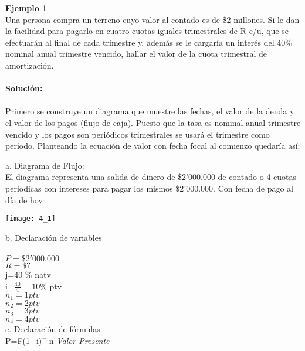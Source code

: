 \textbf{Ejemplo 1}\\

Una persona compra un terreno cuyo valor al contado es de \$2 millones. Si le dan la facilidad para pagarlo en cuatro cuotas iguales trimestrales de R c/u, que se efectuarán al final de cada trimestre y, además se le cargaría un interés del 40\% nominal anual trimestre vencido, hallar el valor de la cuota trimestral de amortización.\\\\
\textbf{Solución:}\\\\
Primero se construye un diagrama que muestre las fechas, el valor de la deuda y el valor de los pagos (flujo de caja). Puesto que la tasa es nominal anual  trimestre vencido y los pagos son  periódicos trimestrales se usará el trimestre como período.	
Planteando la ecuación de valor con fecha focal al comienzo quedaría así:

\clearpage

a. Diagrama de Flujo: \\
El diagrama representa una salida de dinero de \$2'000.000 de contado o 4 cuotas periodicas con intereses para pagar los mismos \$2'000.000. Con fecha de pago al día de hoy.

\begin{center}
	\texttt{[image: 4\_1]}
\end{center}

b. Declaración de variables\\ \\


	
	    $P=\$2'000.000$\\
	$	R=\$?$
		\\
		j=40 \% natv
		\\
		i=$\frac{40}{4}=10\%$ ptv\\
		$n_{1}=1 ptv$\\
		$n_{2}=2 ptv$\\
		$n_{3}=3 ptv$\\
		$n_{4}=4 ptv$\\
		


c. Declaración de fórmulas \\



	P=F(1+i)^{-n} \hspace{35} \textit{Valor Presente} \\
	


